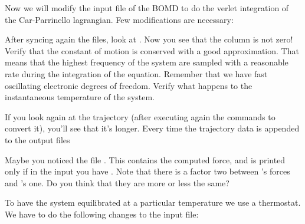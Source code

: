 \documentclass[landscape]{foils}
\begin{document}
Now we will modify the input file of the BOMD to do the verlet integration of the Car-Parrinello lagrangian. Few modifications are necessary:

After syncing again the files, look at . Now you see that the  column is not zero! Verify that the constant of motion is conserved with a good approximation. That means that the highest frequency of the system are sampled with a reasonable rate during the integration of the equation. Remember that we have fast oscillating electronic degrees of freedom. Verify what happens to the instantaneous temperature of the system.

If you look again at the trajectory (after executing again the commands to convert it), you'll see that it's longer. Every time the trajectory data is appended to the output files 

Maybe you noticed the file . This contains the computed force, and is printed only if in the input you have . Note that there is a factor two between 's forces and 's one. Do you think that they are more or less the same?


To have the system equilibrated at a particular temperature we use a thermostat. We have to do the following changes to the input file:
\end{document}
